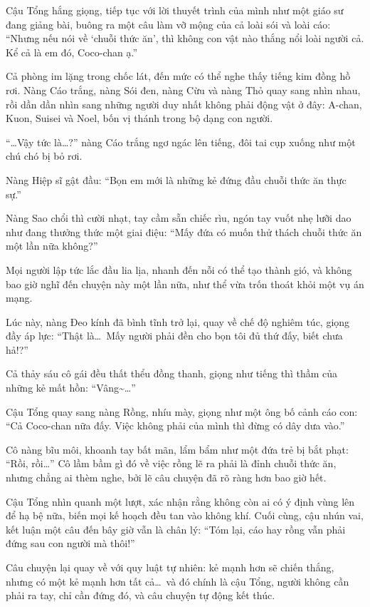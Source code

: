 \documentclass[../main.tex]{subfiles}
\begin{document}
Cậu Tổng hắng giọng, tiếp tục với lời thuyết trình của mình như một giáo sư đang giảng bài, buông ra một câu làm vỡ mộng của cả loài sói và loài cáo: ``Nhưng nếu nói về `chuỗi thức ăn', thì không con vật nào thắng nổi loài người cả. Kể cả là em đó, Coco-chan ạ.''

Cả phòng im lặng trong chốc lát, đến mức có thể nghe thấy tiếng kim đồng hồ rơi. Nàng Cáo trắng, nàng Sói đen, nàng Cừu và nàng Thỏ quay sang nhìn nhau, rồi dần dần nhìn sang những người duy nhất không phải động vật ở đây: A-chan, Kuon, Suisei và Noel, bốn vị thánh trong bộ dạng con người.

``\dots Vậy tức là\dots?'' nàng Cáo trắng ngơ ngác lên tiếng, đôi tai cụp xuống như một chú chó bị bỏ rơi.

Nàng Hiệp sĩ gật đầu: ``Bọn em mới là những kẻ đứng đầu chuỗi thức ăn thực sự.''

Nàng Sao chổi thì cười nhạt, tay cầm sẵn chiếc rìu, ngón tay vuốt nhẹ lưỡi dao như đang thưởng thức một giai điệu: ``Mấy đứa có muốn thử thách chuỗi thức ăn một lần nữa không?''

Mọi người lập tức lắc đầu lia lịa, nhanh đến nỗi có thể tạo thành gió, và không bao giờ nghĩ đến chuyện này một lần nữa, như thể vừa trốn thoát khỏi một vụ án mạng.

Lúc này, nàng Đeo kính đã bình tĩnh trở lại, quay về chế độ nghiêm túc, giọng đầy áp lực: ``Thật là\dots\ Mấy người phải đền cho bọn tôi đủ thứ đấy, biết chưa hả!?''

Cả thảy sáu cô gái đều thất thểu đồng thanh, giọng như tiếng thì thầm của những kẻ mất hồn: ``Vâng\~{}\dots''

Cậu Tổng quay sang nàng Rồng, nhíu mày, giọng như một ông bố cảnh cáo con: ``Cả Coco-chan nữa đấy. Việc không phải của mình thì đừng có dây dưa vào.''

Cô nàng bĩu môi, khoanh tay bất mãn, lẩm bẩm như một đứa trẻ bị bắt phạt: ``Rồi, rồi\dots'' Cô lầm bầm gì đó về việc rồng lẽ ra phải là đỉnh chuỗi thức ăn, nhưng chẳng ai thèm nghe, bởi lẽ câu chuyện đã rõ ràng hơn bao giờ hết.

Cậu Tổng nhìn quanh một lượt, xác nhận rằng không còn ai có ý định vùng lên để hạ bệ nữa, biến mọi kế hoạch đều tan vào không khí. Cuối cùng, cậu nhún vai, kết luận một câu đến bây giờ vẫn là chân lý: ``Tóm lại, cáo hay rồng vẫn phải đứng sau con người mà thôi!''

Câu chuyện lại quay về với quy luật tự nhiên: kẻ mạnh hơn sẽ chiến thắng, nhưng có một kẻ mạnh hơn tất cả\dots\ và đó chính là cậu Tổng, người không cần phải ra tay, chỉ cần đứng đó, và câu chuyện tự động kết thúc.
\end{document}
